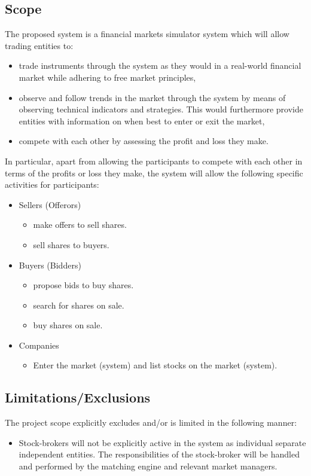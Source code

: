 \documentclass[12pt]{article}
\begin{document}
				\subsection{Scope}
				The proposed system is a financial markets simulator system which will allow trading entities to:
				\begin{itemize}
				\item trade instruments through the system as they would in a real-world financial market while adhering to free market principles,
				\item observe and follow trends in the market through the system by means of observing technical indicators and strategies. This would furthermore provide entities with information on when best to enter or exit the market,
				\item compete with each other by assessing the profit and loss they make.
				\end{itemize}
				
				In particular, apart from allowing the participants to compete with each other in terms of the profits or loss they make, the system will allow the following specific activities for participants:
				
				\begin{itemize}
				\item Sellers (Offerors)
					\begin{itemize}
					\item make offers to sell shares.
					\item sell shares to buyers.
					\end{itemize}
				\item Buyers (Bidders)
					\begin{itemize}
					\item propose bids to buy shares.
					\item search for shares on sale.
					\item buy shares on sale.
					\end{itemize}
				\item Companies
					\begin{itemize}
					\item Enter the market (system) and list stocks on the market (system).
					\end{itemize}
				
				\end{itemize}
				\subsection{Limitations/Exclusions}
				The project scope explicitly excludes and/or is limited in the following manner:
				\begin{itemize}
				\item Stock-brokers will not be explicitly active in the system as individual separate independent entities. The responsibilities of the stock-broker will be handled and performed by the matching engine and relevant market managers.
				\end{itemize}
					  
\end{document}
